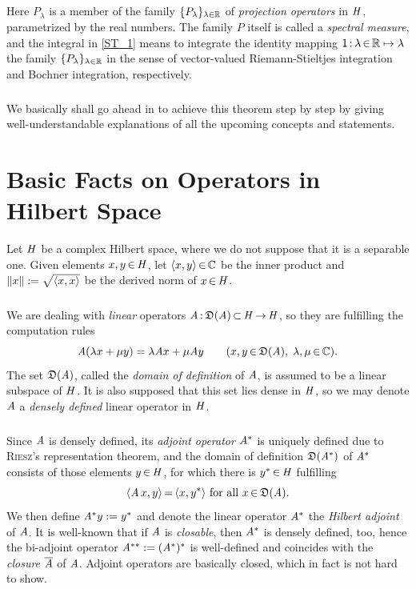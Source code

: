 \documentclass[11pt,twoside]{article}
\begin{document}
\subparagraph{}
Here $P_{\lambda}$ is a member
of the family
$\{P_{\lambda}\}_{\lambda \in {\mathbb{R}}}$
of \textit{projection operators} in $\mathit{H}$,
parametrized by the real numbers.
The family $P$ itself is called a \textit{spectral measure},
and the integral in \eqref{ST_1} means to integrate
the identity mapping ${\mathsf{1}} {\,:\,} \lambda {\,\in\,} {\mathbb{R}} \mapsto \lambda$
{\wrt} the family $\{P_{\lambda}\}_{\lambda \in {\mathbb{R}}}$ in the sense of vector-valued
Riemann-Stieltjes integration and Bochner integration,
respectively.

\subparagraph{}
We basically shall go ahead in to achieve this theorem step by step
by giving well-understandable explanations of all the upcoming concepts and
statements.

\section{Basic Facts on Operators in Hilbert Space}                            %
Let $\mathit{H}$ be a complex Hilbert space,
where we do not suppose that it is a separable one.
Given elements $x,y {\,\in\,} \mathit{H}$,
let $\langle x,y \rangle {\,\in\,} {\mathbb{C}}$ be the inner product
and $\left\lVert x \right\rVert := \sqrt{\langle x,x \rangle}$ be the derived norm of $x {\,\in\,} \mathit{H}$.

\subparagraph{}
We are dealing with \textit{linear} operators
$\mathit{A} {\,:\,}\mathfrak{D}(\mathit{A}) {\,\subset\,} \mathit{H} {\,\to\,} \mathit{H}$,
so they are fulfilling the computation rules
\[
\mathit{A}(\lambda x+ \mu y) = \lambda \mathit{A} x + \mu \mathit{A} y
\quad \quad (x,y {\,\in\,} \mathfrak{D}(\mathit{A}), \; \lambda,\mu {\,\in\,} {\mathbb{C}}).
\]
The set $\mathfrak{D}(\mathit{A})$,
called the \textit{domain of definition} of $\mathit{A}$,
is assumed to be a linear subspace of $\mathit{H}$.
It is also supposed that this set lies dense in $\mathit{H}$,
so we may denote $\mathit{A}$ a \textit{densely defined} linear operator in $\mathit{H}$.

\subparagraph{}
Since $\mathit{A}$ is densely defined,
its \textit{adjoint operator} $\mathit{A}^*$ is uniquely defined
due to \textsc{Riesz}'s representation theorem,
and the domain of definition $\mathfrak{D}(\mathit{A}^*)$
of $\mathit{A}^*$ consists of those elements $y {\,\in\,} \mathit{H}$,
for which there is $y^* {\,\in\,} \mathit{H}$ fulfilling
\[
\langle \mathit{A} \,x,y \rangle {\,=\,} \langle x,y^* \rangle \mbox{ for all } x {\,\in\,} \mathfrak{D}(\mathit{A}).
\]
We then define $\mathit{A}^* y := y^*$ and denote the linear operator $\mathit{A}^*$
the \textit{Hilbert adjoint} of $\mathit{A}$.
It is well-known
that if $\mathit{A}$ is \textit{closable},
then $\mathit{A}^*$ is densely defined,
too,
hence the bi-adjoint operator $\mathit{A}^{**} := (\mathit{A}^*)^*$ is well-defined
and coincides with the \textit{closure} $\overline{\mathit{A}}$ of $\mathit{A}$.
Adjoint operators are basically closed,
which in fact is not hard to show.
\end{document}
